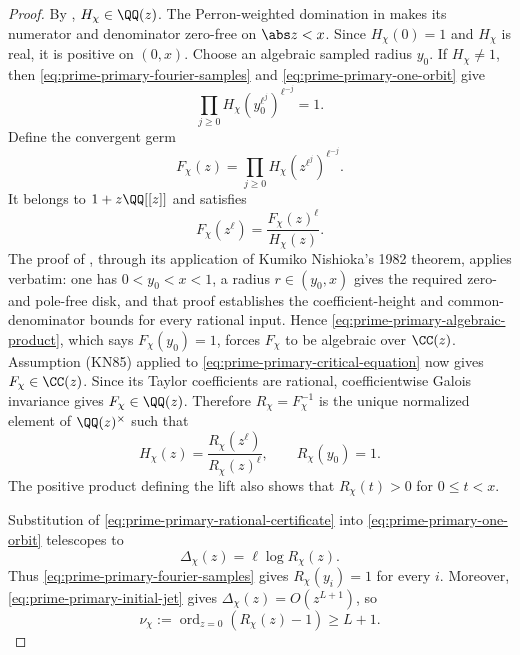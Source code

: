 \begin{proof}
By , \(H_\chi\in\QQ(z)\).  The
Perron-weighted domination in  makes its
numerator and denominator zero-free on \(\abs z<x\).  Since
\(H_\chi(0)=1\) and \(H_\chi\) is real, it is positive on \((0,x)\).
Choose an algebraic sampled radius \(y_0\).  If \(H_\chi\ne1\), then
\eqref{eq:prime-primary-fourier-samples} and
\eqref{eq:prime-primary-one-orbit} give
\begin{equation}\label{eq:prime-primary-algebraic-product}
 \prod_{j\ge0}H_\chi(y_0^{\ell^j})^{\ell^{-j}}=1.
\end{equation}
Define the convergent germ
\[
 F_\chi(z)=\prod_{j\ge0}H_\chi(z^{\ell^j})^{\ell^{-j}}.
\]
It belongs to \(1+z\QQ[[z]]\) and satisfies
\begin{equation}\label{eq:prime-primary-critical-equation}
 F_\chi(z^\ell)=\frac{F_\chi(z)^\ell}{H_\chi(z)}.
\end{equation}
The proof of , through its
application of Kumiko Nishioka's 1982 theorem, applies verbatim: one has
\(0<y_0<x<1\), a radius \(r\in(y_0,x)\) gives the required zero- and
pole-free disk, and that proof establishes the coefficient-height and
common-denominator bounds for every rational input.  Hence
\eqref{eq:prime-primary-algebraic-product}, which says \(F_\chi(y_0)=1\),
forces \(F_\chi\) to be algebraic over \(\CC(z)\).  Assumption
\textup{(KN85)} applied to \eqref{eq:prime-primary-critical-equation} now
gives \(F_\chi\in\CC(z)\).  Since its Taylor coefficients are rational,
coefficientwise Galois invariance gives \(F_\chi\in\QQ(z)\).  Therefore
\(R_\chi=F_\chi^{-1}\) is the unique normalized element of
\(\QQ(z)^\times\) such that
\begin{equation}\label{eq:prime-primary-rational-certificate}
 H_\chi(z)=\frac{R_\chi(z^\ell)}{R_\chi(z)^\ell},
 \qquad R_\chi(y_0)=1.
\end{equation}
The positive product defining the lift also shows that
\(R_\chi(t)>0\) for \(0\le t<x\).

Substitution of \eqref{eq:prime-primary-rational-certificate} into
\eqref{eq:prime-primary-one-orbit} telescopes to
\begin{equation}\label{eq:prime-primary-rational-telescope}
 \Delta_\chi(z)=\ell\log R_\chi(z).
\end{equation}
Thus \eqref{eq:prime-primary-fourier-samples} gives
\(R_\chi(y_i)=1\) for every \(i\).  Moreover,
\eqref{eq:prime-primary-initial-jet} gives
\(\Delta_\chi(z)=O(z^{L+1})\), so
\begin{equation}\label{eq:prime-primary-certificate-jet}
 \nu_\chi:=\operatorname{ord}_{z=0}(R_\chi(z)-1)\ge L+1.
\end{equation}


\end{proof}
